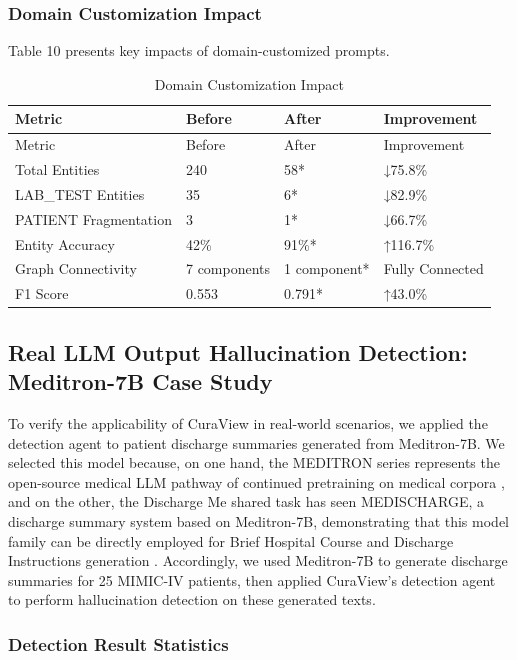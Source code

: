 \documentclass[11pt]{article}
\begin{document}
\subsubsection{Domain Customization Impact}

Table 10 presents key impacts of domain-customized prompts.

\begin{longtable}[]{@{}llll@{}}
\caption{Domain Customization Impact}\tabularnewline
\toprule\noalign{}
Metric & Before & After & Improvement \\
\midrule\noalign{}
\endfirsthead
\toprule\noalign{}
Metric & Before & After & Improvement \\
\midrule\noalign{}
\endhead
\bottomrule\noalign{}
\endlastfoot
Total Entities & 240 & 58* & ↓75.8\% \\
LAB\_TEST Entities & 35 & 6* & ↓82.9\% \\
PATIENT Fragmentation & 3 & 1* & ↓66.7\% \\
Entity Accuracy & 42\% & 91\%* & ↑116.7\% \\
Graph Connectivity & 7 components & 1 component* & Fully Connected \\
F1 Score & 0.553 & 0.791* & ↑43.0\% \\
\end{longtable}

\subsection{Real LLM Output Hallucination Detection: Meditron-7B Case Study}

To verify the applicability of CuraView in real-world scenarios, we applied the detection agent to patient discharge summaries generated from Meditron-7B. We selected this model because, on one hand, the MEDITRON series represents the open-source medical LLM pathway of continued pretraining on medical corpora \citep{chen2023meditron70b}, and on the other, the Discharge Me shared task has seen MEDISCHARGE, a discharge summary system based on Meditron-7B, demonstrating that this model family can be directly employed for Brief Hospital Course and Discharge Instructions generation \citep{wu2024epflMakeDischargeMe}. Accordingly, we used Meditron-7B to generate discharge summaries for 25 MIMIC-IV patients, then applied CuraView's detection agent to perform hallucination detection on these generated texts.

\subsubsection{Detection Result Statistics}
\end{document}
